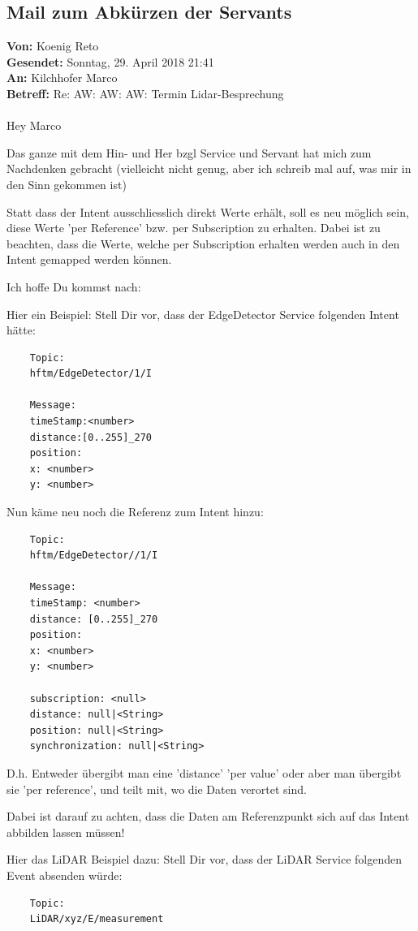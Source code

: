 \subsection{Mail zum Abkürzen der Servants}
\begin{formal}
	\textbf{Von:} Koenig Reto\\
	\textbf{Gesendet:} Sonntag, 29. April 2018 21:41\\
	\textbf{An:} Kilchhofer Marco\\
	\textbf{Betreff:} Re: AW: AW: AW: Termin Lidar-Besprechung\\
	\\
	Hey Marco
	
	Das ganze mit dem Hin- und Her bzgl Service und Servant hat mich zum 
	Nachdenken gebracht (vielleicht nicht genug, aber ich schreib mal auf, was mir 
	in den Sinn gekommen ist)
	
	Statt dass der Intent ausschliesslich direkt Werte erhält, soll es neu möglich sein, diese Werte 'per Reference' bzw. per Subscription zu erhalten. Dabei ist zu beachten, dass die Werte, welche per Subscription erhalten werden auch in den Intent gemapped werden können.
	
	Ich hoffe Du kommst nach:
	
	Hier ein Beispiel:
	Stell Dir vor, dass der EdgeDetector Service folgenden Intent hätte:
	
	\begin{verbatim}
	Topic:
	hftm/EdgeDetector/1/I
	
	Message:
	timeStamp:<number>
	distance:[0..255]_270
	position:
	x: <number>
	y: <number>
	\end{verbatim}
	
	Nun käme neu noch die Referenz zum Intent hinzu:
	\begin{verbatim}
	Topic:
	hftm/EdgeDetector//1/I
	
	Message:
	timeStamp: <number>
	distance: [0..255]_270
	position:
	x: <number>
	y: <number>
	
	subscription: <null>
	distance: null|<String>
	position: null|<String>
	synchronization: null|<String>
	\end{verbatim}
	
	D.h.
	Entweder übergibt man eine 'distance' 'per value' oder aber man übergibt sie 'per reference', und teilt mit, wo die Daten verortet sind.
	
	Dabei ist darauf zu achten, dass die Daten am Referenzpunkt sich auf das Intent abbilden lassen müssen!
	
	Hier das LiDAR Beispiel dazu:
	Stell Dir vor, dass der LiDAR  Service folgenden Event absenden würde:
	\begin{verbatim}
	Topic:
	LiDAR/xyz/E/measurement
	

\end{verbatim}
\end{formal}
